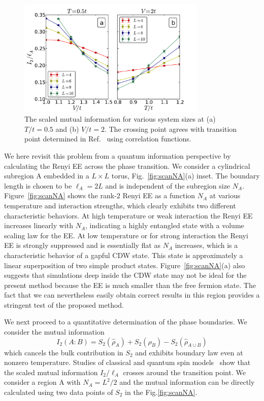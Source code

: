 \documentclass[twocolumn,english,prl,showpacs]{revtex4}
\begin{document}
\begin{figure}[t]
\centering
\includegraphics[width=9cm]{MI.pdf}
\caption{The scaled mutual information for various system sizes at (a) $T/t=0.5$ and (b) $V/t=2$. The crossing point agrees with transition point determined in Ref.~\cite{Gubernatis:1985wo} using correlation functions.}
\label{fig:MI}
\end{figure}


We here revisit this problem from a quantum information perspective by calculating the Renyi EE across the phase transition. We consider a cylindrical subregion A embedded in a $L\times L$ torus,  Fig.~\ref{fig:scanNA}(a) inset. The boundary length is chosen to be $\ell_{A} =2L$ and is independent of the subregion size $N_{A}$. Figure~\ref{fig:scanNA} shows the rank-$2$ Renyi EE as a function $N_{A}$ at various temperature and interaction strengths, which clearly exhibits two different characteristic behaviors. At high temperature or weak interaction the Renyi EE increases linearly with $N_{A}$, indicating a highly entangled state with a volume scaling law for the EE. At low temperature or for strong interaction the Renyi EE is strongly suppressed and is essentially flat  as $N_{A}$ increases, which is a characteristic behavior of a gapful CDW state. This state is approximately a linear superposition of two simple product states. Figure~\ref{fig:scanNA}(a) also suggests that simulations deep inside the CDW state may not be ideal for the present method because the EE is much smaller than the free fermion state. The fact that we can nevertheless easily obtain correct results in this region provides a stringent test of the proposed method.

We next proceed to a quantitative determination of the phase boundaries. We consider the  mutual information~\cite{Wolf:2008hta, Melko:2010jda}
\begin{equation}
I_{2}(A:B) = S_{2}(\hat{\rho}_{A}) + S_{2}(\hat{\rho}_{B}) - S_{2}(\hat{\rho}_{A\cup B}) 
\label{eq:MI}
\end{equation} 
which cancels the bulk contribution in $S_{2}$ and exhibits boundary law even at nonzero temperature. Studies of classical and quantum spin models~\cite{Melko:2010jda, PhysRevLett.106.135701,  Iaconis:2013jz, PhysRevE.89.012125} show that the scaled mutual information $I_{2}/\ell_{A}$ crosses around the transition point. We consider a region A with $N_{A}=L^{2}/2$ and the mutual information can be directly calculated using two data points of $S_{2}$ in the Fig.\ref{fig:scanNA}. 
\end{document}
